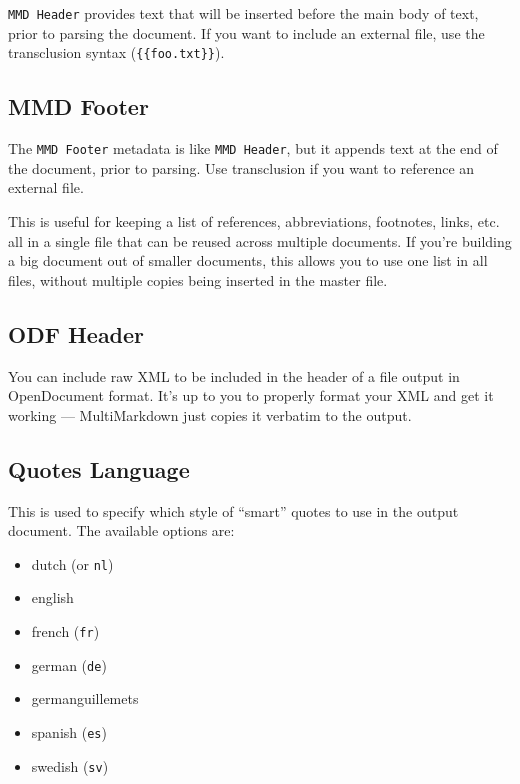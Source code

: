 \texttt{MMD Header} provides text that will be inserted before the main body of text, prior to parsing the document. If you want to include an external file, use the transclusion syntax (\texttt{\{\{foo.txt\}\}}).

\subsection{MMD Footer }
\label{mmdfooter}

The \texttt{MMD Footer} metadata is like \texttt{MMD Header}, but it appends text at the end of the document, prior to parsing. Use transclusion if you want to reference an external file.

This is useful for keeping a list of references, abbreviations, footnotes, links, etc. all in a single file that can be reused across multiple documents. If you're building a big document out of smaller documents, this allows you to use one list in all files, without multiple copies being inserted in the master file.

\subsection{ODF Header }
\label{odfheader}

You can include raw XML to be included in the header of a file output in
OpenDocument format. It's up to you to properly format your XML and get it
working --- MultiMarkdown just copies it verbatim to the output.

\subsection{Quotes Language }
\label{quoteslanguage}

This is used to specify which style of ``smart'' quotes to use in the output document. The available options are:

\begin{itemize}
\item dutch (or \texttt{nl})

\item english

\item french (\texttt{fr})

\item german (\texttt{de})

\item germanguillemets

\item spanish (\texttt{es})

\item swedish (\texttt{sv})

\end{itemize}

